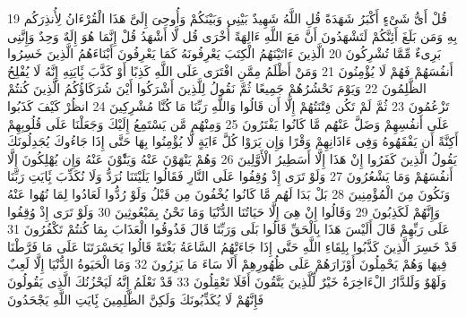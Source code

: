 {\tiny\colorbox{cl_aya}{19}} قُلْ أَىُّ شَىْءٍ أَكْبَرُ شَهَدَةً قُلِ اللَّهُ شَهِيدٌ بَيْنِى وَبَيْنَكُمْ وَأُوحِىَ إِلَىَّ هَذَا الْقُرْءَانُ لِأُنذِرَكُم بِهِ وَمَن بَلَغَ أَئِنَّكُمْ لَتَشْهَدُونَ أَنَّ مَعَ اللَّهِ ءَالِهَةً أُخْرَى قُل لَّا أَشْهَدُ قُلْ إِنَّمَا هُوَ إِلَهٌ وَحِدٌ وَإِنَّنِى بَرِىءٌ مِّمَّا تُشْرِكُونَ
{\tiny\colorbox{cl_aya}{20}} الَّذِينَ ءَاتَيْنَهُمُ الْكِتَبَ يَعْرِفُونَهُ كَمَا يَعْرِفُونَ أَبْنَاءَهُمُ الَّذِينَ خَسِرُوا أَنفُسَهُمْ فَهُمْ لَا يُؤْمِنُونَ
{\tiny\colorbox{cl_aya}{21}} وَمَنْ أَظْلَمُ مِمَّنِ افْتَرَى عَلَى اللَّهِ كَذِبًا أَوْ كَذَّبَ بَِٔايَتِهِ إِنَّهُ لَا يُفْلِحُ الظَّلِمُونَ
{\tiny\colorbox{cl_aya}{22}} وَيَوْمَ نَحْشُرُهُمْ جَمِيعًا ثُمَّ نَقُولُ لِلَّذِينَ أَشْرَكُوا أَيْنَ شُرَكَاؤُكُمُ الَّذِينَ كُنتُمْ تَزْعُمُونَ
{\tiny\colorbox{cl_aya}{23}} ثُمَّ لَمْ تَكُن فِتْنَتُهُمْ إِلَّا أَن قَالُوا وَاللَّهِ رَبِّنَا مَا كُنَّا مُشْرِكِينَ
{\tiny\colorbox{cl_aya}{24}} انظُرْ كَيْفَ كَذَبُوا عَلَى أَنفُسِهِمْ وَضَلَّ عَنْهُم مَّا كَانُوا يَفْتَرُونَ
{\tiny\colorbox{cl_aya}{25}} وَمِنْهُم مَّن يَسْتَمِعُ إِلَيْكَ وَجَعَلْنَا عَلَى قُلُوبِهِمْ أَكِنَّةً أَن يَفْقَهُوهُ وَفِى ءَاذَانِهِمْ وَقْرًا وَإِن يَرَوْا كُلَّ ءَايَةٍ لَّا يُؤْمِنُوا بِهَا حَتَّى إِذَا جَاءُوكَ يُجَدِلُونَكَ يَقُولُ الَّذِينَ كَفَرُوا إِنْ هَذَا إِلَّا أَسَطِيرُ الْأَوَّلِينَ
{\tiny\colorbox{cl_aya}{26}} وَهُمْ يَنْهَوْنَ عَنْهُ وَيَنَْٔوْنَ عَنْهُ وَإِن يُهْلِكُونَ إِلَّا أَنفُسَهُمْ وَمَا يَشْعُرُونَ
{\tiny\colorbox{cl_aya}{27}} وَلَوْ تَرَى إِذْ وُقِفُوا عَلَى النَّارِ فَقَالُوا يَلَيْتَنَا نُرَدُّ وَلَا نُكَذِّبَ بَِٔايَتِ رَبِّنَا وَنَكُونَ مِنَ الْمُؤْمِنِينَ
{\tiny\colorbox{cl_aya}{28}} بَلْ بَدَا لَهُم مَّا كَانُوا يُخْفُونَ مِن قَبْلُ وَلَوْ رُدُّوا لَعَادُوا لِمَا نُهُوا عَنْهُ وَإِنَّهُمْ لَكَذِبُونَ
{\tiny\colorbox{cl_aya}{29}} وَقَالُوا إِنْ هِىَ إِلَّا حَيَاتُنَا الدُّنْيَا وَمَا نَحْنُ بِمَبْعُوثِينَ
{\tiny\colorbox{cl_aya}{30}} وَلَوْ تَرَى إِذْ وُقِفُوا عَلَى رَبِّهِمْ قَالَ أَلَيْسَ هَذَا بِالْحَقِّ قَالُوا بَلَى وَرَبِّنَا قَالَ فَذُوقُوا الْعَذَابَ بِمَا كُنتُمْ تَكْفُرُونَ
{\tiny\colorbox{cl_aya}{31}} قَدْ خَسِرَ الَّذِينَ كَذَّبُوا بِلِقَاءِ اللَّهِ حَتَّى إِذَا جَاءَتْهُمُ السَّاعَةُ بَغْتَةً قَالُوا يَحَسْرَتَنَا عَلَى مَا فَرَّطْنَا فِيهَا وَهُمْ يَحْمِلُونَ أَوْزَارَهُمْ عَلَى ظُهُورِهِمْ أَلَا سَاءَ مَا يَزِرُونَ
{\tiny\colorbox{cl_aya}{32}} وَمَا الْحَيَوةُ الدُّنْيَا إِلَّا لَعِبٌ وَلَهْوٌ وَلَلدَّارُ الْءَاخِرَةُ خَيْرٌ لِّلَّذِينَ يَتَّقُونَ أَفَلَا تَعْقِلُونَ
{\tiny\colorbox{cl_aya}{33}} قَدْ نَعْلَمُ إِنَّهُ لَيَحْزُنُكَ الَّذِى يَقُولُونَ فَإِنَّهُمْ لَا يُكَذِّبُونَكَ وَلَكِنَّ الظَّلِمِينَ بَِٔايَتِ اللَّهِ يَجْحَدُونَ
